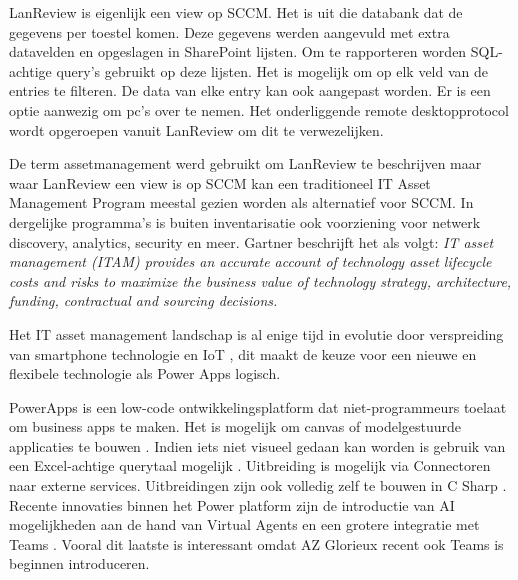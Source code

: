 
LanReview is eigenlijk een view op SCCM. Het is uit die databank dat de gegevens per toestel komen. Deze gegevens werden aangevuld met extra datavelden en opgeslagen in SharePoint lijsten. Om te rapporteren worden SQL-achtige query's gebruikt op deze lijsten. Het is mogelijk om op elk veld van de entries te filteren. De data van elke entry kan ook aangepast worden. Er is een optie aanwezig om pc's over te nemen. Het onderliggende remote desktopprotocol wordt opgeroepen vanuit LanReview om dit te verwezelijken.

De term assetmanagement werd gebruikt om LanReview te beschrijven maar waar LanReview een view is op SCCM kan een traditioneel IT Asset Management Program meestal gezien worden als alternatief voor SCCM. In dergelijke programma's is buiten inventarisatie ook voorziening voor netwerk discovery, analytics, security en meer. Gartner \parencite{Gartner2020} beschrijft het als volgt: \emph{IT asset management (ITAM) provides an accurate account of technology asset lifecycle costs and risks to maximize the business value of technology strategy, architecture, funding, contractual and sourcing decisions.}

Het IT asset management landschap is al enige tijd in evolutie door verspreiding van smartphone technologie en  IoT \parencite{Badnakhe2020}, dit maakt de keuze voor een nieuwe en flexibele technologie als Power Apps logisch.

PowerApps is een low-code ontwikkelingsplatform dat niet-programmeurs toelaat om business apps te maken. Het is mogelijk om canvas of modelgestuurde applicaties te bouwen \parencite{Knight2019}. Indien iets niet visueel gedaan kan worden is gebruik van een Excel-achtige querytaal mogelijk \parencite{Owen2019}. Uitbreiding is mogelijk via Connectoren naar externe services. Uitbreidingen zijn ook volledig zelf te bouwen in C Sharp \parencite{Vivek2019}.
Recente innovaties binnen het Power platform zijn de introductie van AI mogelijkheden aan de hand van Virtual Agents en een grotere integratie met Teams \parencite{Cunningham2019}. Vooral dit laatste is interessant omdat AZ Glorieux recent ook Teams is beginnen introduceren.

